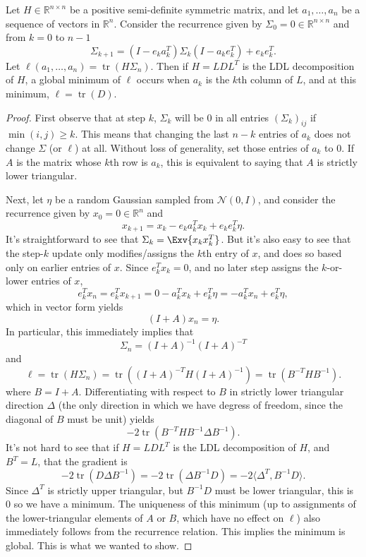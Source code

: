\begin{toappendix}    
\begin{lemma}
\label{lemmaSigmaRecurrence}
Let $H \in \mathbb{R}^{n \times n}$ be a positive semi-definite symmetric matrix, and let $a_1,\ldots,a_n$ be a sequence of vectors in $\mathbb{R}^n$. Consider the recurrence given by $\Sigma_0 = 0 \in \mathbb{R}^{n \times n}$ and from $k=0$ to $n-1$
\[
    \Sigma_{k+1} = (I - e_k a_k^T) \Sigma_k (I - a_k e_k^T) + e_k e_k^T.
\]
Let $\ell(a_1,\ldots,a_n) = \operatorname{tr}\left(H \Sigma_n\right)$.
Then if $H = L D L^T$ is the LDL decomposition of $H$, a global minimum of $\ell$ occurs when $a_k$ is the $k$th column of $L$, and at this minimum, $\ell = \operatorname{tr}\left(D\right)$.
\end{lemma}
\begin{proof}
First observe that at step $k$, $\Sigma_k$ will be $0$ in all entries $(\Sigma_k)_{ij}$ if $\min(i,j) \ge k$. This means that changing the last $n-k$ entries of $a_k$ does not change $\Sigma$ (or $\ell$) at all. Without loss of generality, set those entries of $a_k$ to $0$. If $A$ is the matrix whose $k$th row is $a_k$, this is equivalent to saying that $A$ is strictly lower triangular.

Next, let $\eta$ be a random Gaussian sampled from $\mathcal{N}(0, I)$, and consider the recurrence given by $x_0 = 0 \in \mathbb{R}^n$ and
\[
    x_{k+1} = x_k - e_k a_k^T x_k + e_k e_k^T \eta.
\]
It's straightforward to see that $\Sigma_k = \Exv{ x_k x_k^T }$. But it's also easy to see that the step-$k$ update only modifies/assigns the $k$th entry of $x$, and does so based only on earlier entries of $x$. Since $e_k^T x_k = 0$, and no later step assigns the $k$-or-lower entries of $x$,
\[
    e_k^T x_n = e_k^T x_{k+1} = 0 - a_k^T x_k + e_k^T \eta = - a_k^T x_n + e_k^T \eta,
\]
which in vector form yields
\[
    (I + A) x_n = \eta.
\]
In particular, this immediately implies that
\[
    \Sigma_n = (I + A)^{-1} (I + A)^{-T}
\]
and
\[
    \ell = \operatorname{tr}\left(H \Sigma_n\right) = \operatorname{tr}\left( (I + A)^{-T} H (I + A)^{-1} \right) = \operatorname{tr}\left( B^{-T} H B^{-1} \right).
\]
where $B = I+A$. Differentiating with respect to $B$ in strictly lower triangular direction $\Delta$ (the only direction in which we have degress of freedom, since the diagonal of $B$ must be unit) yields 
\[
   -2 \operatorname{tr}\left( B^{-T} H B^{-1} \Delta B^{-1} \right).
\]
It's not hard to see that if $H = L D L^T$ is the LDL decomposition of $H$, and $B^T = L$, that the gradient is
\[
   -2 \operatorname{tr}\left( D \Delta B^{-1} \right)
   =
   -2 \operatorname{tr}\left( \Delta B^{-1} D \right)
   =
   -2 \langle \Delta^T, B^{-1} D \rangle.
\]
Since $\Delta^T$ is strictly upper triangular, but $B^{-1} D$ must be lower triangular, this is $0$ so we have a minimum. The uniqueness of this minimum (up to assignments of the lower-triangular elements of $A$ or $B$, which have no effect on $\ell$) also immediately follows from the recurrence relation. This implies the minimum is global. This is what we wanted to show.
\end{proof}
\end{toappendix}

